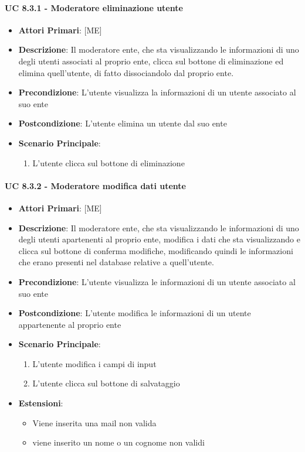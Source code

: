 			\paragraph{UC 8.3.1 - Moderatore eliminazione utente}
			\begin{itemize}
				\item \textbf{Attori Primari}: [ME]
				\item \textbf{Descrizione}: Il moderatore ente, che sta visualizzando le informazioni di uno degli utenti associati al proprio ente, clicca sul bottone di eliminazione ed elimina quell'utente, di fatto dissociandolo dal proprio ente.
				\item \textbf{Precondizione}: L'utente visualizza la informazioni di un utente associato al suo ente
				\item \textbf{Postcondizione}: L'utente elimina un utente dal suo ente 
				\item \textbf{Scenario Principale}:
				\begin{enumerate}
					\item{L'utente clicca sul bottone di eliminazione}
				\end{enumerate}
			\end{itemize}

			\paragraph{UC 8.3.2 - Moderatore modifica dati utente}
			\begin{itemize}
				\item \textbf{Attori Primari}: [ME]
				\item \textbf{Descrizione}: Il moderatore ente, che sta visualizzando le informazioni di uno degli utenti apartenenti al proprio ente, modifica i dati che sta visualizzando e clicca sul bottone di conferma modifiche, modificando quindi le informazioni che erano presenti nel database relative a quell'utente.
				\item \textbf{Precondizione}: L'utente visualizza le informazioni di un utente associato al suo ente
				\item \textbf{Postcondizione}: L'utente modifica le informazioni di un utente appartenente al proprio ente 
				\item \textbf{Scenario Principale}:
				\begin{enumerate}
					\item{L'utente modifica i campi di input}
					\item{L'utente clicca sul bottone di salvataggio}
				\end{enumerate}
				\item \textbf{Estensioni}:
					\begin{itemize}
						\item Viene inserita una mail non valida
						\item viene inserito un nome o un cognome non validi
					\end{itemize}	
			\end{itemize}

